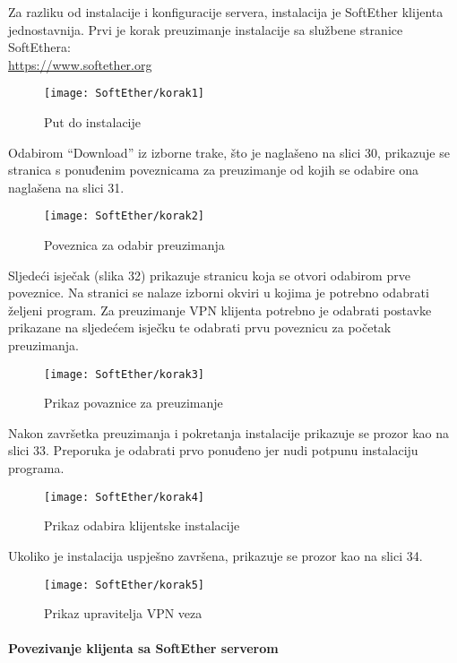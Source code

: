 \hfill \smallbreak
Za razliku od instalacije i konfiguracije servera, instalacija je SoftEther klijenta jednostavnija. Prvi je korak preuzimanje instalacije sa službene stranice SoftEthera:\\ \url{https://www.softether.org}
\begin{figure}[h!]
	\centering
     \texttt{[image: SoftEther/korak1]}
     	\caption{Put do instalacije}
\end{figure}
\FloatBarrier
Odabirom ``Download'' iz izborne trake, što je naglašeno na slici 30,  prikazuje se stranica s ponuđenim poveznicama za preuzimanje od kojih se odabire ona naglašena na slici 31.
\begin{figure}[h!]
     \centering
     \texttt{[image: SoftEther/korak2]}
     \caption{Poveznica za odabir preuzimanja}
\end{figure}
\FloatBarrier
Sljedeći isječak (slika 32) prikazuje stranicu koja se otvori odabirom prve poveznice. Na stranici se nalaze izborni okviri u kojima je potrebno odabrati željeni program. Za preuzimanje VPN klijenta potrebno je odabrati postavke prikazane na sljedećem isječku te odabrati prvu poveznicu za početak preuzimanja.
\begin{figure}[h!]
     \centering
     \texttt{[image: SoftEther/korak3]}
     \caption{Prikaz povaznice za preuzimanje}
\end{figure}
\FloatBarrier
Nakon završetka preuzimanja i pokretanja instalacije prikazuje se prozor kao na slici 33. Preporuka je odabrati prvo ponuđeno jer nudi potpunu instalaciju programa.
\begin{figure}[h!]
     \centering
     \texttt{[image: SoftEther/korak4]}
     \caption{Prikaz odabira klijentske instalacije}
\end{figure}
\FloatBarrier
Ukoliko je instalacija uspješno završena, prikazuje se prozor kao na slici 34.
\begin{figure}[h!]
     \centering
     \texttt{[image: SoftEther/korak5]}
     \caption{Prikaz upravitelja VPN veza}
\end{figure}
\FloatBarrier
\newpage
\paragraph*{Povezivanje klijenta sa SoftEther serverom}

